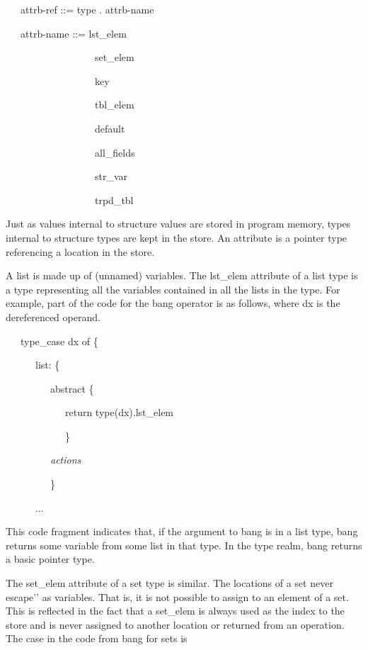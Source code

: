 {\ttfamily\mdseries
\ \ \ attrb-ref ::= type . attrb-name}

{\ttfamily\mdseries
\ \ \ attrb-name ::= lst\_elem {\textbar}}

{\ttfamily\mdseries
\ \ \ \ \ \ \ \ \ \ \ \ \ \ \ \ \ \ set\_elem {\textbar}}

{\ttfamily\mdseries
\ \ \ \ \ \ \ \ \ \ \ \ \ \ \ \ \ \ key {\textbar}}

{\ttfamily\mdseries
\ \ \ \ \ \ \ \ \ \ \ \ \ \ \ \ \ \ tbl\_elem {\textbar}}

{\ttfamily\mdseries
\ \ \ \ \ \ \ \ \ \ \ \ \ \ \ \ \ \ default {\textbar}}

{\ttfamily\mdseries
\ \ \ \ \ \ \ \ \ \ \ \ \ \ \ \ \ \ all\_fields {\textbar}}

{\ttfamily\mdseries
\ \ \ \ \ \ \ \ \ \ \ \ \ \ \ \ \ \ str\_var {\textbar}}

{\ttfamily\mdseries
\ \ \ \ \ \ \ \ \ \ \ \ \ \ \ \ \ \ trpd\_tbl}


Just as values internal to structure values are stored in program
memory, types internal to structure types are kept in the store. An
attribute is a pointer type referencing a location in the store.

A list is made up of (unnamed) variables. The lst\_elem attribute of a
list type is a type representing all the variables contained in all
the lists in the type. For example, part of the code for the bang
operator is as follows, where dx is the dereferenced operand.

{\ttfamily\mdseries
\ \ \ type\_case dx of \{}

{\ttfamily\mdseries
\ \ \ \ \ \ list: \{}

{\ttfamily\mdseries
\ \ \ \ \ \ \ \ \ abstract \{}

{\ttfamily\mdseries
\ \ \ \ \ \ \ \ \ \ \ \ return type(dx).lst\_elem}

{\ttfamily\mdseries
\ \ \ \ \ \ \ \ \ \ \ \ \}}

{\ttfamily\mdseries
\ \ \ \ \ \ \ \ \ \textit{actions}}

{\ttfamily\mdseries
\ \ \ \ \ \ \ \ \ \}}

{\ttfamily\mdseries
\ \ \ \ \ \ ...}


This code fragment indicates that, if the argument to bang is in a
list type, bang returns some variable from some list in that type. In
the type realm, bang returns a basic pointer type.

The set\_elem attribute of a set type is similar. The locations of a
set never {\textasciigrave}{\textasciigrave}escape'{}' as
variables. That is, it is not possible to assign to an element of a
set. This is reflected in the fact that a set\_elem is always used as
the index to the store and is never assigned to another location or
returned from an operation. The case in the code from bang for sets is

